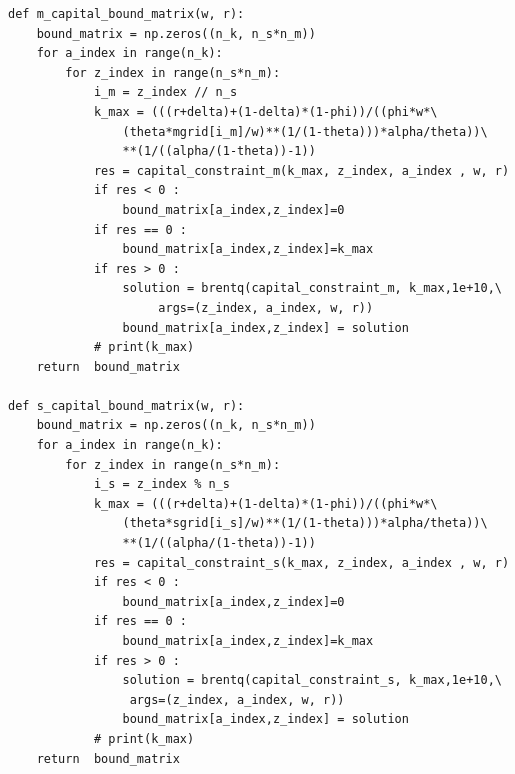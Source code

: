 \documentclass[a4paper, 12pt]{ctexart}
\begin{document}
\begin{lstlisting}
def m_capital_bound_matrix(w, r):
    bound_matrix = np.zeros((n_k, n_s*n_m))
    for a_index in range(n_k):
        for z_index in range(n_s*n_m):
            i_m = z_index // n_s
            k_max = (((r+delta)+(1-delta)*(1-phi))/((phi*w*\
                (theta*mgrid[i_m]/w)**(1/(1-theta)))*alpha/theta))\
                **(1/((alpha/(1-theta))-1))
            res = capital_constraint_m(k_max, z_index, a_index , w, r)
            if res < 0 :
                bound_matrix[a_index,z_index]=0
            if res == 0 :
                bound_matrix[a_index,z_index]=k_max
            if res > 0 :
                solution = brentq(capital_constraint_m, k_max,1e+10,\
                     args=(z_index, a_index, w, r))
                bound_matrix[a_index,z_index] = solution
            # print(k_max)
    return  bound_matrix
    
def s_capital_bound_matrix(w, r):
    bound_matrix = np.zeros((n_k, n_s*n_m))
    for a_index in range(n_k):
        for z_index in range(n_s*n_m):
            i_s = z_index % n_s
            k_max = (((r+delta)+(1-delta)*(1-phi))/((phi*w*\
                (theta*sgrid[i_s]/w)**(1/(1-theta)))*alpha/theta))\
                **(1/((alpha/(1-theta))-1))
            res = capital_constraint_s(k_max, z_index, a_index , w, r)
            if res < 0 :
                bound_matrix[a_index,z_index]=0
            if res == 0 :
                bound_matrix[a_index,z_index]=k_max
            if res > 0 :
                solution = brentq(capital_constraint_s, k_max,1e+10,\
                 args=(z_index, a_index, w, r))
                bound_matrix[a_index,z_index] = solution
            # print(k_max)
    return  bound_matrix
\end{lstlisting}
\end{document}
